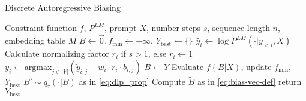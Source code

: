 \begin{algorithm}
    \caption{Discrete Autoregressive Biasing}
    \begin{algorithmic}[1]
    \REQUIRE Constraint function $f$, $P^{LM}$, prompt $X$, number steps $s$, sequence length $n$, embedding table $M$
    \STATE $\tilde{B} \gets \vec{0}, f_\text{min} \gets -\infty$, $Y_\text{best} \gets \{\}$ 
            \STATE $\tilde{y_i} \gets \log P^{LM} (\cdot | y_{<i}, X)$ 
            \STATE Calculate normalizing factor $r_i$ if $s > 1$, else $r_i \gets 1$
            \STATE $y_i \gets \text{argmax}_{j \in |V|} \left(\tilde{y}_{i, j} - w_i \cdot r_i \cdot \tilde{b}_{i, j} \right)$ 
        \ENDFOR
        \STATE $B \gets Y$ 
        \STATE Evaluate $f(B | X)$, update $f_\text{min}$, $Y_\text{best}$
        \STATE $B' \sim q_\tau(\cdot | B)$ as in \eqref{eq:dlp_prop} 
        \STATE Compute $\tilde{B}$ as in \eqref{eq:bias-vec-def}
    \ENDFOR
    \STATE return $Y_\text{best}$
    \end{algorithmic}
\label{alg:text-gen}
\end{algorithm}
